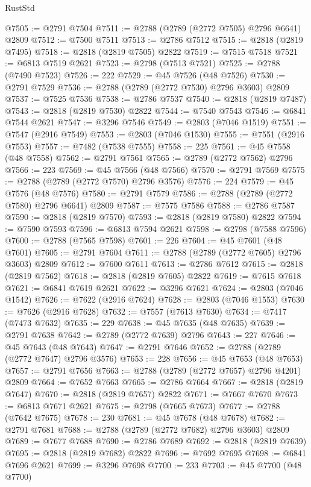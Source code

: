 \begin{lexlean}{RustStd}
\begin{coremodule}
@7505 := @2791 @7504
@7511 := @2788 (@2789 (@2772 @7505) @2796 @6641) @2809
@7512 := @7500 @7511
@7513 := @2786 @7512
@7515 := @2818 (@2819 @7495)
@7518 := @2818 (@2819 @7505) @2822
@7519 := @7515 @7518
@7521 := @6813 @7519 @2621
@7523 := @2798 (@7513 @7521)
@7525 := @2788 (@7490 @7523)
@7526 := 222
@7529 := @45 @7526 (@48 @7526)
@7530 := @2791 @7529
@7536 := @2788 (@2789 (@2772 @7530) @2796 @3603) @2809
@7537 := @7525 @7536
@7538 := @2786 @7537
@7540 := @2818 (@2819 @7487)
@7543 := @2818 (@2819 @7530) @2822
@7544 := @7540 @7543
@7546 := @6841 @7544 @2621
@7547 := @3296 @7546
@7549 := @2803 (@7046 @1519)
@7551 := @7547 (@2916 @7549)
@7553 := @2803 (@7046 @1530)
@7555 := @7551 (@2916 @7553)
@7557 := @7482 (@7538 @7555)
@7558 := 225
@7561 := @45 @7558 (@48 @7558)
@7562 := @2791 @7561
@7565 := @2789 (@2772 @7562) @2796
@7566 := 223
@7569 := @45 @7566 (@48 @7566)
@7570 := @2791 @7569
@7575 := @2788 (@2789 (@2772 @7570) @2796 @3576)
@7576 := 224
@7579 := @45 @7576 (@48 @7576)
@7580 := @2791 @7579
@7586 := @2788 (@2789 (@2772 @7580) @2796 @6641) @2809
@7587 := @7575 @7586
@7588 := @2786 @7587
@7590 := @2818 (@2819 @7570)
@7593 := @2818 (@2819 @7580) @2822
@7594 := @7590 @7593
@7596 := @6813 @7594 @2621
@7598 := @2798 (@7588 @7596)
@7600 := @2788 (@7565 @7598)
@7601 := 226
@7604 := @45 @7601 (@48 @7601)
@7605 := @2791 @7604
@7611 := @2788 (@2789 (@2772 @7605) @2796 @3603) @2809
@7612 := @7600 @7611
@7613 := @2786 @7612
@7615 := @2818 (@2819 @7562)
@7618 := @2818 (@2819 @7605) @2822
@7619 := @7615 @7618
@7621 := @6841 @7619 @2621
@7622 := @3296 @7621
@7624 := @2803 (@7046 @1542)
@7626 := @7622 (@2916 @7624)
@7628 := @2803 (@7046 @1553)
@7630 := @7626 (@2916 @7628)
@7632 := @7557 (@7613 @7630)
@7634 := @7417 (@7473 @7632)
@7635 := 229
@7638 := @45 @7635 (@48 @7635)
@7639 := @2791 @7638
@7642 := @2789 (@2772 @7639) @2796
@7643 := 227
@7646 := @45 @7643 (@48 @7643)
@7647 := @2791 @7646
@7652 := @2788 (@2789 (@2772 @7647) @2796 @3576)
@7653 := 228
@7656 := @45 @7653 (@48 @7653)
@7657 := @2791 @7656
@7663 := @2788 (@2789 (@2772 @7657) @2796 @4201) @2809
@7664 := @7652 @7663
@7665 := @2786 @7664
@7667 := @2818 (@2819 @7647)
@7670 := @2818 (@2819 @7657) @2822
@7671 := @7667 @7670
@7673 := @6813 @7671 @2621
@7675 := @2798 (@7665 @7673)
@7677 := @2788 (@7642 @7675)
@7678 := 230
@7681 := @45 @7678 (@48 @7678)
@7682 := @2791 @7681
@7688 := @2788 (@2789 (@2772 @7682) @2796 @3603) @2809
@7689 := @7677 @7688
@7690 := @2786 @7689
@7692 := @2818 (@2819 @7639)
@7695 := @2818 (@2819 @7682) @2822
@7696 := @7692 @7695
@7698 := @6841 @7696 @2621
@7699 := @3296 @7698
@7700 := 233
@7703 := @45 @7700 (@48 @7700)

\end{coremodule}
\end{lexlean}
